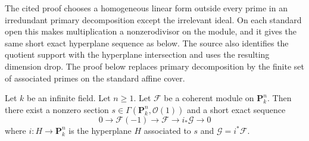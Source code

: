 \begin{lemma}
\label{lemma-exact-sequence-induction}
\begin{reference}
\cite[Chapter III, \S 6, no. 81, proof of Proposition 6, p. 277]{FAC}
\end{reference}
\begin{history}
The cited proof chooses a homogeneous linear form outside every prime in an
irredundant primary decomposition except the irrelevant ideal. On each
standard open this makes multiplication a nonzerodivisor on the module, and
it gives the same short exact hyperplane sequence as below. The source also
identifies the quotient support with the hyperplane intersection and uses the
resulting dimension drop. The proof below replaces primary decomposition by
the finite set of associated primes on the standard affine cover.
\end{history}
Let $k$ be an infinite field. Let $n \geq 1$.
Let $\mathcal{F}$ be a coherent module on $\mathbf{P}^n_k$.
Then there exist a nonzero section
$s \in \Gamma(\mathbf{P}^n_k, \mathcal{O}(1))$
and a short exact sequence
$$
0 \to \mathcal{F}(-1) \to \mathcal{F} \to i_*\mathcal{G} \to 0
$$
where $i : H \to \mathbf{P}^n_k$ is the hyperplane $H$ associated to $s$
and $\mathcal{G} = i^*\mathcal{F}$.
\end{lemma}

